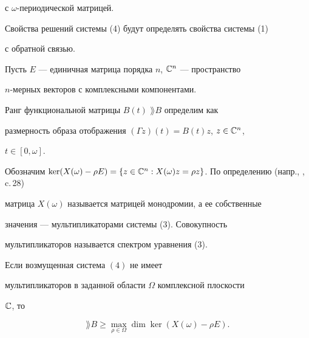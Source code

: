 с $\omega$-периодической матрицей.


Свойства решений системы (4) будут определять свойства системы (1)


с обратной связью.





Пусть $E$ --- единичная матрица порядка $n$, $\Bbb C^n$ --- пространство


$n$-мерных векторов с комплексными компонентами.


Ранг функциональной матрицы $B(t)$\; $\rang B$ определим как


размерность образа отображения $(\Gamma z)(t) = B(t)z$, $z\in \Bbb C^n$,


$t\in [0,\omega]$.


Обозначим $\ker (X(\omega) - \rho E) = \{z\in \Bbb C^n :


X(\omega)z = \rho z\}$. По определению (напр., \cite{1}, c.\,28)


матрица $X(\omega)$ называется матрицей монодромии, а ее собственные


значения --- мультипликаторами системы (3). Совокупность


мультипликаторов называется спектром уравнения (3).





\begin{lem} Если возмущенная система $(4)$ не имеет


мультипликаторов в заданной области $\Omega$ комплексной плоскости


$\Bbb C$, то


\begin{equation}


\rang B \ge \max_{\rho\in \Omega}\dim\ker(X(\omega) - \rho E).


\end{equation}


\end{lem}





